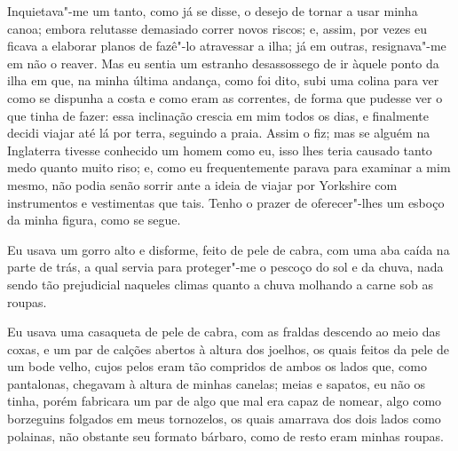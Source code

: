 Inquietava"-me um tanto, como já se disse, o desejo de tornar a usar
minha canoa; embora relutasse demasiado correr novos riscos; e, assim,
por vezes eu ficava a elaborar planos de fazê"-lo atravessar a ilha; já
em outras, resignava"-me em não o reaver. Mas eu sentia um estranho
desassossego de ir àquele ponto da ilha em que, na minha última andança,
como foi dito, subi uma colina para ver como se dispunha a costa e como
eram as correntes, de forma que pudesse ver o que tinha de fazer: essa
inclinação crescia em mim todos os dias, e finalmente decidi viajar até
lá por terra, seguindo a praia. Assim o fiz; mas se alguém na Inglaterra
tivesse conhecido um homem como eu, isso lhes teria causado tanto medo
quanto muito riso; e, como eu frequentemente parava para examinar a mim
mesmo, não podia senão sorrir ante a ideia de viajar por Yorkshire com
instrumentos e vestimentas que tais. Tenho o prazer de oferecer"-lhes um
esboço da minha figura, como se segue.

Eu usava um gorro alto e disforme, feito de pele de cabra, com uma aba
caída na parte de trás, a qual servia para proteger"-me o pescoço do sol
e da chuva, nada sendo tão prejudicial naqueles climas quanto a chuva
molhando a carne sob as roupas.

Eu usava uma casaqueta de pele de cabra, com as fraldas descendo ao meio
das coxas, e um par de calções abertos à altura dos joelhos, os quais
feitos da pele de um bode velho, cujos pelos eram tão compridos de ambos
os lados que, como pantalonas, chegavam à altura de minhas canelas;
meias e sapatos, eu não os tinha, porém fabricara um par de algo que mal
era capaz de nomear, algo como borzeguins folgados em meus tornozelos,
os quais amarrava dos dois lados como polainas, não obstante seu formato
bárbaro, como de resto eram minhas roupas.

